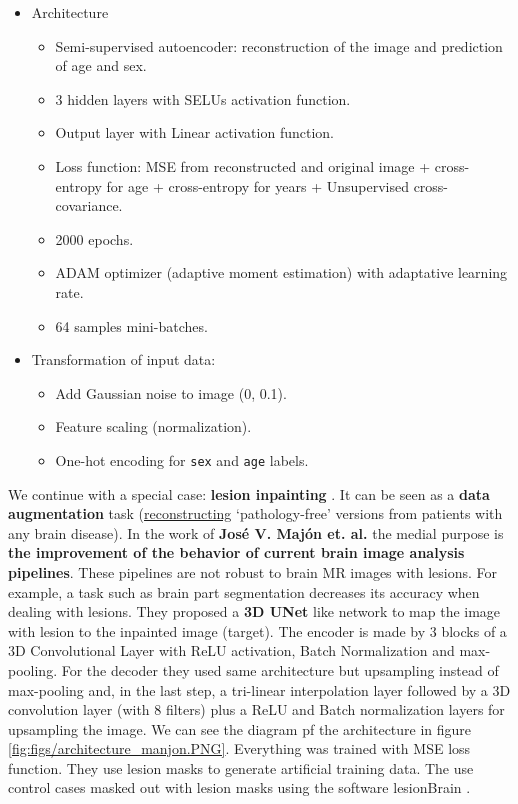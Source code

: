 \begin{itemize}
\item Architecture
    \begin{itemize}
        \item Semi-supervised autoencoder: reconstruction of the image and prediction of age and sex.
        \item 3 hidden layers with SELUs activation function.
        \item Output layer with Linear activation function.
        \item Loss function: MSE from reconstructed and original image + cross-entropy for age + cross-entropy for years + Unsupervised cross-covariance.
        \item 2000 epochs.
        \item ADAM optimizer (adaptive moment estimation) with adaptative learning rate.
        \item 64 samples mini-batches.
    \end{itemize}
\item Transformation of input data:
    \begin{itemize}
        \item Add Gaussian noise to image (0, 0.1).
        \item Feature scaling (normalization).
        \item One-hot encoding for \texttt{sex} and \texttt{age} labels.
    \end{itemize}
\end{itemize}

We continue with a special case: \textbf{lesion inpainting} \cite{2020inpainting}. It can be seen as a \textbf{data augmentation} task (\underline{reconstructing} ‘pathology-free’ versions from patients with any brain disease). In the work of \textbf{José V. Majón et. al.} \cite{2020inpainting} the medial purpose is \textbf{the improvement of the behavior of current brain image analysis pipelines}.  These pipelines are not robust to brain MR images with lesions. For example, a task such as brain part segmentation decreases its accuracy when dealing with lesions. They proposed a \textbf{3D UNet} like network to map the image with lesion to the inpainted image (target). The encoder is made by 3 blocks of a 3D Convolutional Layer with ReLU activation, Batch Normalization and max-pooling. For the decoder they used same architecture but upsampling instead of max-pooling and, in the last step, a  tri-linear interpolation layer followed by a 3D convolution layer (with 8 filters) plus a ReLU and Batch normalization layers for upsampling the image. We can see the diagram pf the architecture in figure \ref{fig:figs/architecture_manjon.PNG}. Everything was trained with MSE loss function. They use lesion masks to generate artificial training data. The use control cases masked out with lesion masks using the software lesionBrain \cite{lesionBrain}.

